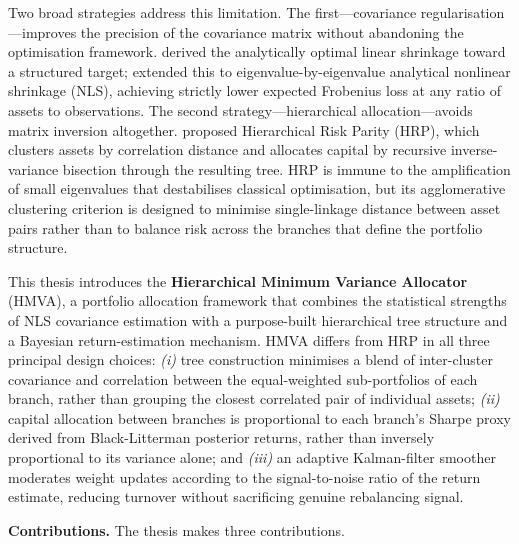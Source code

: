 \documentclass[a4paper,12pt]{report}
\begin{document}
Two broad strategies address this limitation. The first---covariance
regularisation---improves the precision of the covariance matrix without
abandoning the optimisation framework. \citet{ledoitwolf2004} derived the
analytically optimal linear shrinkage toward a structured target;
\citet{ledoitwolf2020} extended this to eigenvalue-by-eigenvalue analytical
nonlinear shrinkage (NLS), achieving strictly lower expected Frobenius loss at
any ratio of assets to observations. The second strategy---hierarchical
allocation---avoids matrix inversion altogether. \citet{lopezdeprado2016}
proposed Hierarchical Risk Parity (HRP), which clusters assets by correlation
distance and allocates capital by recursive inverse-variance bisection through
the resulting tree. HRP is immune to the amplification of small eigenvalues
that destabilises classical optimisation, but its agglomerative clustering
criterion is designed to minimise single-linkage distance between asset pairs
rather than to balance risk across the branches that define the portfolio
structure.

This thesis introduces the \textbf{Hierarchical Minimum Variance Allocator}
(HMVA), a portfolio allocation framework that combines the statistical
strengths of NLS covariance estimation with a purpose-built hierarchical tree
structure and a Bayesian return-estimation mechanism. HMVA differs from HRP
in all three principal design choices: \textit{(i)} tree construction
minimises a blend of inter-cluster covariance and correlation between the
equal-weighted sub-portfolios of each branch, rather than grouping the
closest correlated pair of individual assets; \textit{(ii)} capital allocation
between branches is proportional to each branch's Sharpe proxy derived from
Black-Litterman posterior returns, rather than inversely proportional to its
variance alone; and \textit{(iii)} an adaptive Kalman-filter smoother
moderates weight updates according to the signal-to-noise ratio of the return
estimate, reducing turnover without sacrificing genuine rebalancing signal.

\textbf{Contributions.} The thesis makes three contributions.
\end{document}
